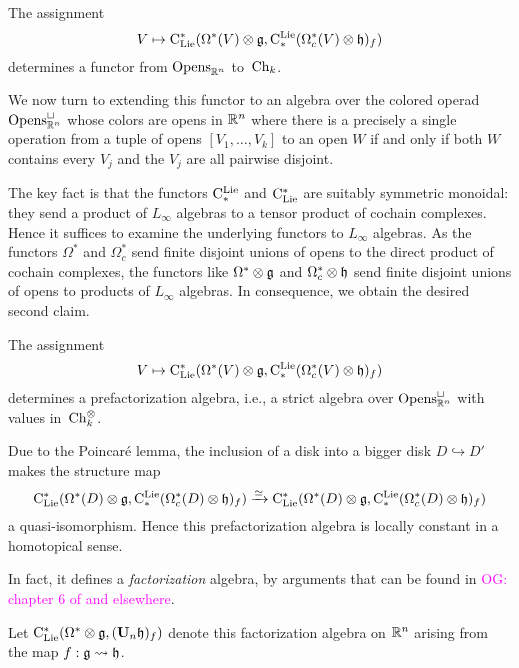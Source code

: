 \documentclass[11pt]{amsart}
\numberwithin{equation}{section}
\def\owen{\textcolor{magenta}{OG: }\textcolor{magenta}}
\begin{document}
\begin{lmm}
The assignment
\[
V \mapsto {\rm C}_{\rm Lie}^*(\Omega^*(V) \otimes \mathfrak g, {\rm C}^{\rm Lie}_*(\Omega^*_c(V) \otimes \mathfrak h)_f)
\]
determines a functor from ${\rm Opens}_{\mathbb R^n}$ to~${\rm Ch}_k$.
\end{lmm}

We now turn to extending this functor to an algebra over the colored operad ${\rm Opens}_{\mathbb R^n}^\sqcup$ whose colors are opens in $\mathbb R^n$ where there is a precisely a single operation from a tuple of opens $[V_1,\ldots,V_k]$ to an open $W$ if and only if both $W$ contains every $V_j$ and the $V_j$ are all pairwise disjoint.

The key fact is that the functors ${\rm C}^{\rm Lie}_*$ and ${\rm C}_{\rm Lie}^*$ are suitably symmetric monoidal:
they send a product of $L_\infty$ algebras to a tensor product of cochain complexes.
Hence it suffices to examine the underlying functors to $L_\infty$ algebras.
As the functors $\Omega^*$ and $\Omega^*_c$ send finite disjoint unions of opens to the direct product of cochain complexes, 
the functors like $\Omega^* \otimes \mathfrak g$ and $\Omega^*_c \otimes \mathfrak h$ send finite disjoint unions of opens to products of $L_\infty$ algebras.
In consequence, we obtain the desired second claim.

\begin{lmm}
The assignment
\[
V \mapsto {\rm C}_{\rm Lie}^*(\Omega^*(V) \otimes \mathfrak g, {\rm C}^{\rm Lie}_*(\Omega^*_c(V) \otimes \mathfrak h)_f)
\]
determines a prefactorization algebra, i.e., a strict algebra over ${\rm Opens}_{\mathbb R^n}^\sqcup$ with values in~${\rm Ch}_k^\otimes$.
\end{lmm}

Due to the Poincar\'e lemma, the inclusion of a disk into a bigger disk $D \hookrightarrow D'$ makes the structure map 
\[
{\rm C}_{\rm Lie}^*(\Omega^*(D) \otimes \mathfrak g, {\rm C}^{\rm Lie}_*(\Omega^*_c(D) \otimes \mathfrak h)_f) \xrightarrow{\simeq} {\rm C}_{\rm Lie}^*(\Omega^*(D) \otimes \mathfrak g, {\rm C}^{\rm Lie}_*(\Omega^*_c(D) \otimes \mathfrak h)_f)
\]
a quasi-isomorphism.
Hence this prefactorization algebra is locally constant in a homotopical sense.

In fact, it defines a {\em factorization} algebra, by arguments that can be found in \owen{chapter 6 of \cite{CG1} and elsewhere}.

\begin{dfn}
\label{dfn: centralizer for f}
Let ${\rm C}_{\rm Lie}^*(\Omega^* \otimes \mathfrak g, (\mathbf U_n \mathfrak h)_f)$ denote this factorization algebra on $\mathbb R^n$ arising from the map $f: \mathfrak g \rightsquigarrow \mathfrak h$.
\end{dfn}
\end{document}
